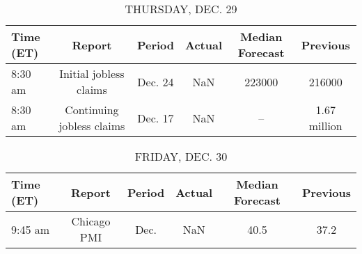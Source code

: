 \documentclass{article}%
\begin{document}
%


\begin{table}[htbp]%
\caption{THURSDAY, DEC. 29}%
\centering%
\begin{adjustbox}{width=1\textwidth}%
\begin{tabular}{lccccc}
\toprule
Time (ET) &                    Report &  Period & Actual & Median Forecast &     Previous \\
\midrule
  8:30 am &    Initial jobless claims & Dec. 24 &    NaN &          223000 &       216000 \\
  8:30 am & Continuing jobless claims & Dec. 17 &    NaN &              -- & 1.67 million \\
\bottomrule
\end{tabular}
%
\end{adjustbox}%
\end{table}

%


\begin{table}[htbp]%
\caption{FRIDAY, DEC. 30}%
\centering%
\begin{adjustbox}{width=1\textwidth}%
\begin{tabular}{lccccc}
\toprule
Time (ET) &      Report & Period & Actual & Median Forecast & Previous \\
\midrule
  9:45 am & Chicago PMI &   Dec. &    NaN &            40.5 &     37.2 \\
\bottomrule
\end{tabular}
%
\end{adjustbox}%
\end{table}
\end{document}
